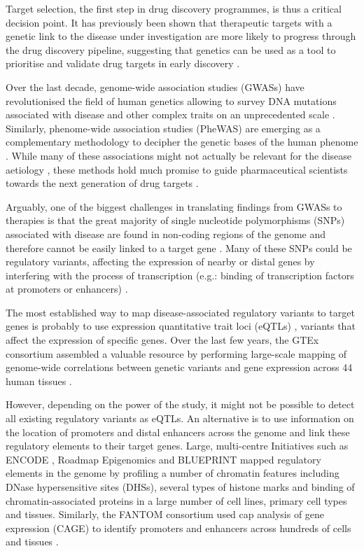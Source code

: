 \documentclass[9pt,a4paper,]{extarticle}
\begin{document}
Target selection, the first step in drug discovery programmes, is thus a critical decision point.
It has previously been shown that therapeutic targets with a genetic link to the disease under investigation are more likely to progress through the drug discovery pipeline, suggesting that genetics can be used as a tool to prioritise and validate drug targets in early discovery \citep{Plenge2013, Nelson2015}.

Over the last decade, genome-wide association studies (GWASs) have revolutionised the field of human genetics allowing to survey DNA mutations associated with disease and other complex traits on an unprecedented scale \citep{Visscher2017}.
Similarly, phenome-wide association studies (PheWAS) are emerging as a complementary methodology to decipher the genetic bases of the human phenome \citep{Bush2016}.
While many of these associations might not actually be relevant for the disease aetiology \citep{Boyle2017}, these methods hold much promise to guide pharmaceutical scientists towards the next generation of drug targets \citep{Finan2017}.

Arguably, one of the biggest challenges in translating findings from GWASs to therapies is that the great majority of single nucleotide polymorphisms (SNPs) associated with disease are found in non-coding regions of the genome and therefore cannot be easily linked to a target gene \citep{Maurano2012}.
Many of these SNPs could be regulatory variants, affecting the expression of nearby or distal genes by interfering with the process of transcription (e.g.: binding of transcription factors at promoters or enhancers) \citep{Ward2012}.

The most established way to map disease-associated regulatory variants to target genes is probably to use expression quantitative trait loci (eQTLs) \citep{Albert2015}, variants that affect the expression of specific genes.
Over the last few years, the GTEx consortium assembled a valuable resource by performing large-scale mapping of genome-wide correlations between genetic variants and gene expression across 44 human tissues \citep{GTEx2017a}.

However, depending on the power of the study, it might not be possible to detect all existing regulatory variants as eQTLs.
An alternative is to use information on the location of promoters and distal enhancers across the genome and link these regulatory elements to their target genes.
Large, multi-centre Initiatives such as ENCODE \citep{ENCODE2012}, Roadmap Epigenomics \citep{Roadmap2015} and BLUEPRINT \citep{Adams2012, Stunnenberg2016} mapped regulatory elements in the genome by profiling a number of chromatin features including DNase hypersensitive sites (DHSs), several types of histone marks and binding of chromatin-associated proteins in a large number of cell lines, primary cell types and tissues.
Similarly, the FANTOM consortium used cap analysis of gene expression (CAGE) to identify promoters and enhancers across hundreds of cells and tissues \citep{Fantom2014}.
\end{document}
